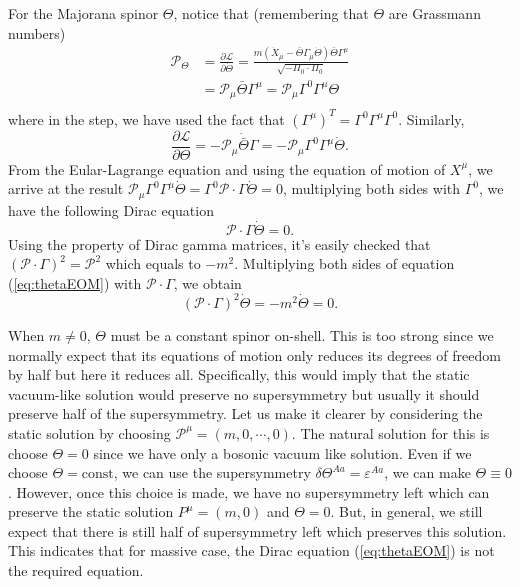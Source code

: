 \documentclass[graybox,envcountchap,sectrefs]{svmono}
\begin{document}
For the Majorana spinor $\Theta$, notice that (remembering that $\Theta$ are Grassmann numbers)
\begin{align}
\mathcal{P}_{\Theta} &=\frac{\partial \mathcal{L}}{\partial \dot{\Theta}}=\frac{m\left(\dot{X}_{\mu}-\bar{\Theta} \Gamma_{\mu} \dot{\Theta}\right) \bar{\Theta} \Gamma^{\mu}}{\sqrt{-\Pi_{0} \cdot \Pi_{0}}}\nonumber \\
&=\mathcal{P}_{\mu} \bar{\Theta} \Gamma^{\mu}=\mathcal{P}_{\mu} \Gamma^{0} \Gamma^{\mu} \Theta \\
\end{align}
where in the step, we have used the fact that $(\Gamma^{\mu})^T=\Gamma^0\Gamma^{\mu}\Gamma^0$.
Similarly, 
\begin{equation}
\frac{\partial \mathcal{L}}{\partial \Theta} =-\mathcal{P}_{\mu} \dot{\bar{\Theta}} \Gamma=-\mathcal{P}_{\mu} \Gamma^{0} \Gamma^{\mu} \dot{\Theta}.
\end{equation}
From the Eular-Lagrange equation and using the equation of motion of $X^{\mu}$, we arrive at the result $\mathcal{P}_{\mu} \Gamma^{0} \Gamma^{\mu} \dot{\Theta}=\Gamma^0 \mathcal{P}\cdot \Gamma \dot{\Theta} =0$, multiplying both sides with $\Gamma^0$, we have the following Dirac equation
\begin{equation}\label{eq:thetaEOM}
	\mathcal{P}\cdot \Gamma \dot{\Theta} =0.
\end{equation}
Using the property of Dirac gamma matrices, it's easily checked that $(\mathcal{P}\cdot \Gamma)^2=\mathcal{P}^2$ which equals to $-m^2$. Multiplying both sides of equation (\ref{eq:thetaEOM}) with $\mathcal{P}\cdot \Gamma$, we obtain
\begin{equation}\label{eq:SUSY0}
(\mathcal{P}\cdot \Gamma)^2 \dot{\Theta}=-m^2\dot{\Theta}=0.	
\end{equation}

When $m\neq 0$, $\Theta$ must be a constant spinor on-shell. This is too strong since we normally expect that its equations of motion only reduces its degrees of freedom by half but here it reduces all.
Specifically, this would imply that the static vacuum-like solution would preserve no supersymmetry but usually it should preserve half of the supersymmetry. 
Let us make it clearer by considering the static solution by choosing $\mathcal{P}^{\mu}=(m, 0,\cdots,0)$. 
The natural solution for this is choose $\Theta=0$ since we have only a bosonic vacuum like solution. Even if we choose $\Theta=\mathrm{const}$, we can use the supersymmetry $\delta \Theta^{Aa}=\varepsilon^{Aa}$, we can make $\Theta\equiv 0$.
However, once this choice is made, we have no supersymmetry left which can preserve the static solution $P^{\mu}=(m, 0)$ and $\Theta=0$. But, in general, we still expect that there is still half of supersymmetry left which preserves this solution. This indicates that for massive case, the Dirac equation (\ref{eq:thetaEOM}) is not the required equation.
\end{document}
